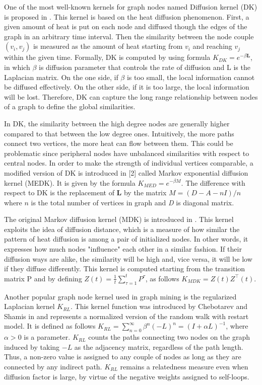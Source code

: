 \documentclass{esannV2}
\begin{document}
One of the most well-known kernels for graph nodes named Diffusion kernel (DK) is proposed in \cite{diffusion_kernel}. This kernel is based on the heat diffusion phenomenon. First, a given amount of heat is put on each node and diffused though the edges of the graph in an arbitrary time interval. Then the similarity between the node couple $(v_{i}, v_{j})$ is measured as the amount of heat starting from $v_{i}$ and reaching $v_{j}$ within the given time. Formally, DK is computed by using formula $K_{DK} = e^{-\beta \textbf{L}}$, in which $\beta$ is diffusion parameter that controls the rate of diffusion and L is the Laplacian matrix. On the one side, if $\beta$ is too small, the local information cannot be diffused effectively. On the other side, if it is too large, the local information will be lost. Therefore, DK can capture the long range relationship between nodes of a graph to define the global similarities. 

In DK, the similarity between the high degree nodes are generally higher compared to that between the low degree ones. Intuitively, the more paths connect two vertices, the more heat can flow between them. This could be problematic since peripheral nodes have unbalanced similarities with respect to central nodes. In order to make the strength of individual vertices comparable, a modified version of DK is introduced in [2] called Markov exponential diffusion kernel (MEDK). It is given by the formula $ K_{MED} = e^{-\beta M}$. The difference with respect to DK is the replacement of \textbf{L} by the matrix $M=(D-A-nI)/n$ where $n$ is the total number of vertices in graph and \textit{D} is diagonal matrix.

The original Markov diffusion kernel (MDK) is introduced in \cite{mdk}. This kernel exploits the idea of diffusion distance, which is a measure of how similar the pattern of heat diffusion is among a pair of initialized nodes. In other words, it expresses how much nodes "influence" each other in a similar fashion. If their diffusion ways are alike, the similarity will be high and, vice versa, it will be low if they diffuse differently. This kernel is computed starting from the transition matrix P and by defining $Z(t) = \frac{1}{t}\sum_{\tau=1}^{t}P^{\tau}$, as follows $K_{MDK} = Z(t)Z^{\top}(t)$.

Another popular graph node kernel used in graph mining is the regularized Laplacian kernel $K_{RL}$. This kernel function was introduced by Chebotarev and Shamis in \cite{rlk} and represents a normalized version of the random walk with restart model. It is defined as follows $K_{RL} = \sum_{n=0}^{\infty}\beta^{n}(-L)^n = (I + \alpha L)^{-1}$, where $\alpha > 0$ is a parameter. $K_{RL}$ counts the paths connecting two nodes on the graph induced by taking $-L$ as the adjacency matrix, regardless of the path length. Thus, a non-zero value is assigned to any couple of nodes as long as they are connected by any indirect path. $K_{RL}$ remains a relatedness measure even when diffusion factor is large, by virtue of the negative weights assigned to self-loops.
\end{document}
